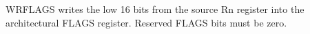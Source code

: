 WRFLAGS writes the low 16 bits from the source Rn register into the architectural FLAGS register. Reserved FLAGS bits must be zero.
